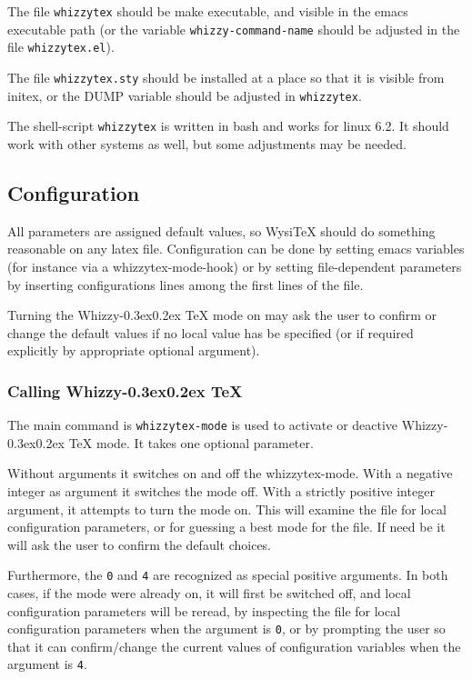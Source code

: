 \documentclass{article}
\let \lst \verb
\def \whizzy{{Whizzy\kern -0.3ex\raise 0.2ex \hbox{\TeX}}}
\begin{document}
The file \lst"whizzytex" should be make executable, and visible in the emacs
executable path (or the variable \lst"whizzy-command-name" should be
adjusted in the file \lst"whizzytex.el"). 

The file \lst"whizzytex.sty" should be installed at a place so that it is
visible  from initex, or the DUMP variable should be adjusted in
\lst"whizzytex".  

The shell-script \lst"whizzytex" is written in bash and works for linux 6.2. 
It should work with other systems as well, but some adjustments may be
needed.

\subsection {Configuration} 

All parameters are assigned default values, so WysiTeX should do something
reasonable on any latex file.
Configuration can be done by setting emacs variables (for instance via a
whizzytex-mode-hook) or by setting file-dependent parameters by 
inserting configurations lines among the first lines of the file.

Turning the {\whizzy} mode on may ask the user to confirm or change the
default values if no local value has be specified (or if required explicitly
by appropriate optional argument).


\subsubsection {Calling {\whizzy}}

The main command is \lst"whizzytex-mode" is used to activate or deactive 
{\whizzy} mode. It takes one optional parameter. 

Without arguments it switches on and off the whizzytex-mode. With a negative
integer as argument it switches the mode off. With a strictly positive
integer argument, it attempts to turn the mode on.  This will examine the
file for local configuration parameters, or for guessing a best mode for the
file. If need be it will ask the user to confirm the default choices.

Furthermore, the \lst"0" and \lst"4" are recognized as special positive
arguments. In both cases, if the mode were already on, it will first be
switched off, and local configuration parameters will be reread, by
inspecting the file for local configuration parameters when the argument is
\lst"0", or by prompting the user so that it can confirm/change the current
values of configuration variables when the argument is \lst"4".
\end{document}

